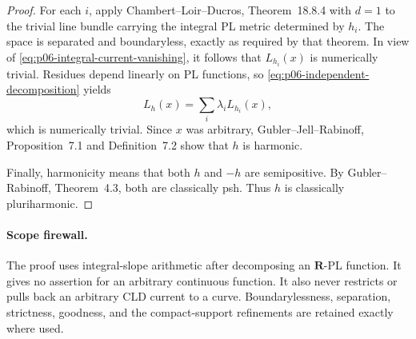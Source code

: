 \begin{proof}
For each $i$, apply Chambert--Loir--Ducros, Theorem~18.8.4 with $d=1$ to
the trivial line bundle carrying the integral PL metric determined by
$h_i$.  The space is separated and boundaryless, exactly as required by
that theorem.  In view of
\eqref{eq:p06-integral-current-vanishing}, it follows that
$L_{h_i}(x)$ is numerically trivial.  Residues depend linearly on PL
functions, so \eqref{eq:p06-independent-decomposition} yields
\[
                         L_h(x)=\sum_i\lambda_iL_{h_i}(x),
\]
which is numerically trivial.  Since $x$ was arbitrary,
Gubler--Jell--Rabinoff, Proposition~7.1 and Definition~7.2 show that $h$
is harmonic.

Finally, harmonicity means that both $h$ and $-h$ are semipositive.  By
Gubler--Rabinoff, Theorem~4.3, both are classically psh.  Thus $h$ is
classically pluriharmonic.
\end{proof}

\paragraph{Scope firewall.}
The proof uses integral-slope arithmetic after decomposing an
$\mathbf R$-PL function.  It gives no assertion for an arbitrary continuous
function.  It also never restricts or pulls back an arbitrary CLD current
to a curve.  Boundarylessness, separation, strictness, goodness, and the
compact-support refinements are retained exactly where used.
